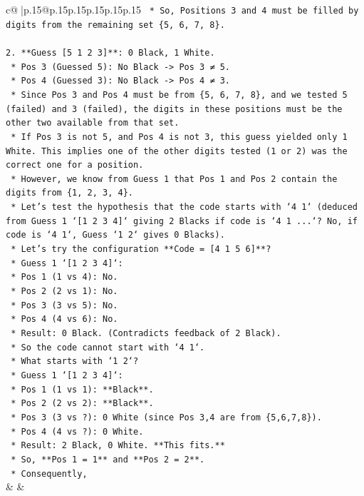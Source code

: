 \documentclass{article}
\begin{document}
{\begin{supertabular}{c@{$\;$}|p{.15\linewidth}@{}p{.15\linewidth}p{.15\linewidth}p{.15\linewidth}p{.15\linewidth}p{.15\linewidth}}
{{{\texttt{    *   So, Positions 3 and 4 must be filled by digits from the remaining set \{5, 6, 7, 8\}.} \\
\\ 
\texttt{2.  **Guess {[}5 1 2 3{]}**: 0 Black, 1 White.} \\
\texttt{    *   Pos 3 (Guessed 5): No Black {-}> Pos 3 ≠ 5.} \\
\texttt{    *   Pos 4 (Guessed 3): No Black {-}> Pos 4 ≠ 3.} \\
\texttt{    *   Since Pos 3 and Pos 4 must be from \{5, 6, 7, 8\}, and we tested 5 (failed) and 3 (failed), the digits in these positions must be the other two available from that set.} \\
\texttt{    *   If Pos 3 is not 5, and Pos 4 is not 3, this guess yielded only 1 White. This implies one of the other digits tested (1 or 2) was the correct one for a position.} \\
\texttt{    *   However, we know from Guess 1 that Pos 1 and Pos 2 contain the digits from \{1, 2, 3, 4\}.} \\
\texttt{    *   Let's test the hypothesis that the code starts with `4 1` (deduced from Guess 1 `{[}1 2 3 4{]}` giving 2 Blacks if code is `4 1 ...`? No, if code is `4 1`, Guess `1 2` gives 0 Blacks).} \\
\texttt{    *   Let's try the configuration **Code = {[}4 1 5 6{]}**?} \\
\texttt{        *   Guess 1 `{[}1 2 3 4{]}`:} \\
\texttt{            *   Pos 1 (1 vs 4): No.} \\
\texttt{            *   Pos 2 (2 vs 1): No.} \\
\texttt{            *   Pos 3 (3 vs 5): No.} \\
\texttt{            *   Pos 4 (4 vs 6): No.} \\
\texttt{            *   Result: 0 Black. (Contradicts feedback of 2 Black).} \\
\texttt{    *   So the code cannot start with `4 1`.} \\
\texttt{    *   What starts with `1 2`?} \\
\texttt{        *   Guess 1 `{[}1 2 3 4{]}`:} \\
\texttt{            *   Pos 1 (1 vs 1): **Black**.} \\
\texttt{            *   Pos 2 (2 vs 2): **Black**.} \\
\texttt{            *   Pos 3 (3 vs ?): 0 White (since Pos 3,4 are from \{5,6,7,8\}).} \\
\texttt{            *   Pos 4 (4 vs ?): 0 White.} \\
\texttt{            *   Result: 2 Black, 0 White. **This fits.**} \\
\texttt{    *   So, **Pos 1 = 1** and **Pos 2 = 2**.} \\
\texttt{    *   Consequently,} \\
            }
        }
    }
    & & \\ \\


\end{supertabular}}
\end{document}
